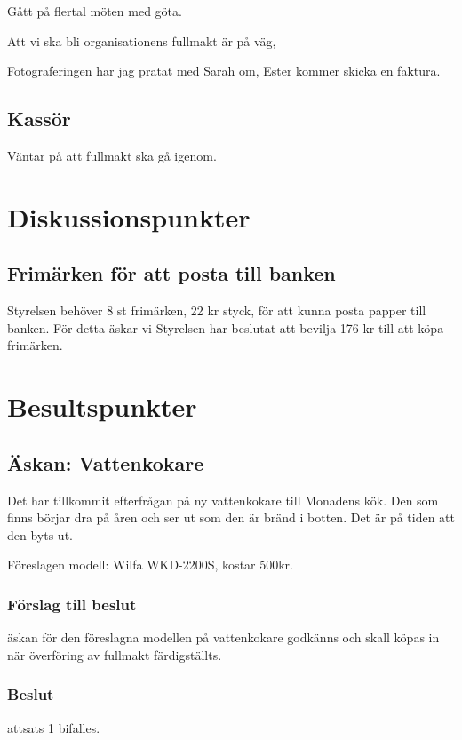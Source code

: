 \documentclass[protokoll]{dvd}
\begin{document}
Gått på flertal möten med göta. 

Att vi ska bli organisationens fullmakt är på väg, 

Fotograferingen har jag pratat med Sarah om, Ester kommer skicka en faktura. 


\subsection{Kassör}
Väntar på att fullmakt ska gå igenom. 


\newpage


\section{Diskussionspunkter}
\subsection{Frimärken för att posta till banken}
Styrelsen behöver 8 st frimärken, 22 kr styck, för att kunna posta papper till banken.  För detta äskar vi 
Styrelsen har beslutat att bevilja 176 kr till att köpa frimärken. 

\section{Besultspunkter}
\subsection{Äskan: Vattenkokare}
Det har tillkommit efterfrågan på ny vattenkokare till Monadens kök. Den som finns börjar dra på åren och ser ut som den är bränd i botten. Det är på tiden att den byts ut.

Föreslagen modell: Wilfa WKD-2200S, kostar 500kr.

\subsubsection*{Förslag till beslut}
\begin{attsatser}
    \item äskan för den föreslagna modellen på vattenkokare godkänns och skall köpas in när överföring av fullmakt färdigställts. 
\end{attsatser}
\subsubsection*{Beslut} 
\begin{attsatser}     
\item attsats 1 bifalles. 
\end{attsatser}
\end{document}
